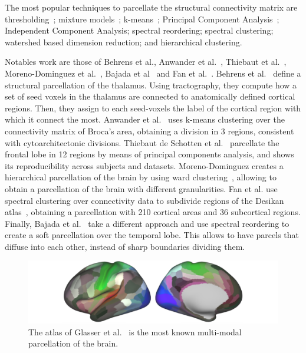 The most popular techniques to parcellate the structural connectivity matrix
are thresholding~\cite{Behrens2003}; mixture models~\cite{Jbabdi2009, Clarkson2010, Paristot2015};
k-means~\cite{Anwander2006}; Principal Component Analysis~\cite{ThiebautdeSchotten2014, ThiebautdeSchotten2016};
Independent Component Analysis\cite{Muircheartaigh2018}; spectral reordering\cite{Bajada2017}; spectral clustering\cite{Fan2016};
watershed based dimension reduction\cite{Roca2009, Lefranc2016}; and hierarchical clustering\cite{Moreno-Dominguez2014, Gallardo2017a}.

Notables work are those of Behrens et al.\cite{Behrens2003}, Anwander et al.~\cite{Anwander2006},
Thiebaut et al.~\cite{ThiebautdeSchotten2016}, Moreno-Dominguez et al.~\cite{Moreno-Dominguez2014},
Bajada et al~\cite{Bajada2017} and Fan et al.~\cite{Fan2016}.
Behrens et al.~\cite{Behrens2003} define a structural parcellation of the thalamus.
Using tractography, they compute how a set of seed voxels in the thalamus are
connected to anatomically defined cortical regions. Then, they assign to each
seed-voxels the label of the cortical region with which it connect the most.
Anwander et al.~\cite{Anwander2006}
uses k-means clustering over the connectivity matrix of Broca's area, obtaining
a division in 3 regions, consistent with cytoarchitectonic divisions.
Thiebaut de Schotten et al.~\cite{ThiebautdeSchotten2016}
parcellate the frontal lobe in 12 regions by means of principal components analysis,
and shows its reproducibility across subjects and datasets.
Moreno-Dominguez creates a hierarchical parcellation of the brain by using
ward clustering~\cite{Moreno-Dominguez2014}, allowing to obtain a parcellation
of the brain with different granularities. Fan et al.\cite{Fan2016} use
spectral clustering over connectivity data to subdivide regions of the Desikan
atlas~\cite{Desikan2006}, obtaining a parcellation with 210 cortical areas and
36 subcortical regions. Finally, Bajada et al.~\cite{Bajada2017} take a different
approach and use spectral reordering to create a soft parcellation over the
temporal lobe. This allows to have parcels that diffuse into each other, instead
of sharp boundaries dividing them.

\begin{figure}[t]
    \includegraphics[width=\textwidth]{4.brain_parcellation/img/multimodal.png}
    \caption{The atlas of Glasser et al.~\cite{Glasser2016} is the most known
             multi-modal parcellation of the brain.}
    \label{fig:brain_function}
\end{figure}

